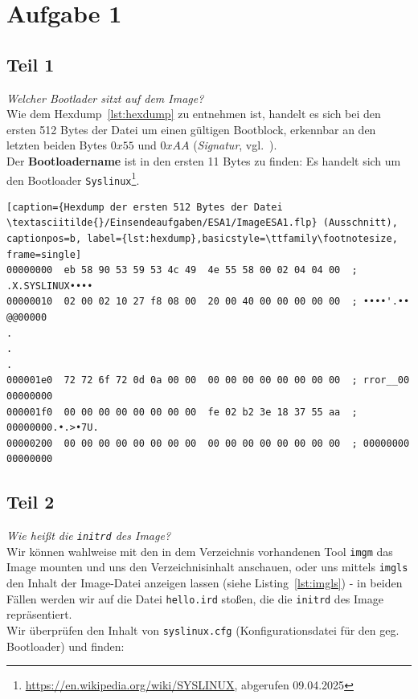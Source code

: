 \chapter{Aufgabe 1}

\section{Teil 1}
\textit{Welcher Bootlader sitzt auf dem Image?}\\

\noindent
Wie dem Hexdump~\ref{lst:hexdump} zu entnehmen ist, handelt es sich bei den ersten 512 Bytes der Datei um einen gültigen Bootblock, erkennbar an den letzten beiden Bytes $0x55$ und $0xAA$ (\textit{Signatur}, vgl.~\cite[142]{ES4}).\\
Der \textbf{Bootloadername} ist in den ersten 11 Bytes zu finden: Es handelt sich um den Bootloader \texttt{Syslinux}\footnote{
\url{https://en.wikipedia.org/wiki/SYSLINUX}, abgerufen 09.04.2025
}.

\vspace{5mm}

\begin{lstlisting}[caption={Hexdump der ersten 512 Bytes der Datei \textasciitilde{}/Einsendeaufgaben/ESA1/ImageESA1.flp} (Ausschnitt), captionpos=b, label={lst:hexdump},basicstyle=\ttfamily\footnotesize, frame=single]
00000000  eb 58 90 53 59 53 4c 49  4e 55 58 00 02 04 04 00  ; .X.SYSLINUX••••
00000010  02 00 02 10 27 f8 08 00  20 00 40 00 00 00 00 00  ; ••••'.•• @@00000
.
.
.
000001e0  72 72 6f 72 0d 0a 00 00  00 00 00 00 00 00 00 00  ; rror__00 00000000
000001f0  00 00 00 00 00 00 00 00  fe 02 b2 3e 18 37 55 aa  ; 00000000.•.>•7U.
00000200  00 00 00 00 00 00 00 00  00 00 00 00 00 00 00 00  ; 00000000 00000000
\end{lstlisting}


\section{Teil 2}

\textit{Wie heißt die  \texttt{initrd} des Image?}\\

\noindent
Wir können wahlweise mit den in dem Verzeichnis vorhandenen Tool \texttt{imgm} das Image mounten und uns den Verzeichnisinhalt anschauen, oder uns mittels \texttt{imgls} den Inhalt der Image-Datei anzeigen lassen  (siehe Listing~\ref{lst:imgls}) - in beiden Fällen werden wir auf die Datei \texttt{hello.ird} stoßen, die die \texttt{initrd} des Image repräsentiert.\\
Wir überprüfen den Inhalt von \texttt{syslinux.cfg} (Konfigurationsdatei für den geg. Bootloader) und finden:

